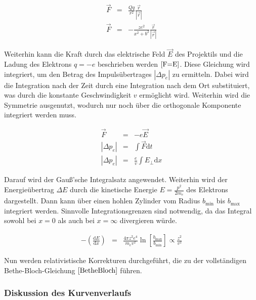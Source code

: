 \documentclass[12pt,a4paper]{scrartcl}
\numberwithin{equation}{section} %
\renewcommand{\[}{} %
\renewcommand{\]}{\noindent} %
\begin{document}
\[
\begin{eqnarray}
    \vec F &=& \frac{Qq}{r^2} \frac{\vec{r}}{\left|\vec r\right|} \\
    \vec F &=& -\frac{ze^2}{x^2+b^2} \frac{\vec{r}}{\left|\vec r\right|}
\end{eqnarray}
\]

Weiterhin kann die Kraft durch das elektrische Feld \(\vec E\) des
Projektils und die Ladung des Elektrons \(q=-e\) beschrieben werden
\(\eqref{F=E}\). Diese Gleichung wird integriert, um den Betrag des
Impulsübertrages \(\left|\Delta p_e\right|\) zu ermitteln. Dabei wird
die Integration nach der Zeit durch eine Integration nach dem Ort
substituiert, was durch die konstante Geschwindigkeit \(v\) ermöglicht
wird. Weiterhin wird die Symmetrie ausgenutzt, wodurch nur noch über die
orthogonale Komponente integriert werden muss.

\[
\begin{eqnarray}
    \vec F &=& -e \vec E \label{F=E} \\
    \left|\Delta p_e\right| &=& \int \vec F \mathrm dt \\
    \left|\Delta p_e\right| &=& \frac{e}{v} \int E_\perp \mathrm dx
\end{eqnarray}
\]

Darauf wird der Gauß'sche Integralsatz angewendet. Weiterhin wird der
Energieübertrag \(\Delta E\) durch die kinetische Energie
\(E=\frac{p^2}{2m_e}\) des Elektrons dargestellt. Dann kann über einen
hohlen Zylinder vom Radius \(b_\mathrm{min}\) bis \(b_\mathrm{max}\)
integriert werden. Sinnvolle Integrationsgrenzen sind notwendig, da das
Integral sowohl bei \(x=0\) als auch bei \(x=\infty\) divergieren würde.

\[
\begin{eqnarray}
    -\left(\frac{\mathrm dE}{\mathrm dx}\right)
        &=& \frac{4\pi z^2 e^4}{m_ev^2}
            \ln\left[\frac{b_\mathrm{max}}{b_\mathrm{min}}\right]
            \propto \frac{z^2}{v^2}
\end{eqnarray}
\]

Nun werden relativistische Korrekturen durchgeführt, die zu der
vollständigen Bethe-Bloch-Gleichung \(\eqref{BetheBloch}\) führen.

\hypertarget{diskussion-des-kurvenverlaufs}{%
\subsubsection{Diskussion des
Kurvenverlaufs}\label{diskussion-des-kurvenverlaufs}}
\end{document}
